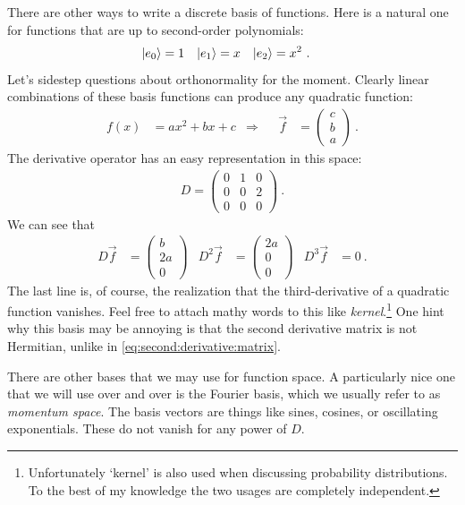 There are other ways to write a discrete basis of functions. Here is a natural one for functions that are up to second-order polynomials:
\begin{align}
  \left|e_0\right\rangle &= 1
  &
  \left|e_1\right\rangle &= x
  &
  \left|e_2\right\rangle &= x^2 \ .
\end{align}
Let’s sidestep questions about orthonormality for the moment. Clearly linear combinations of these basis functions can produce any quadratic function:
\begin{align}
  f(x) &= a x^2 + bx + c
  & \Rightarrow&&
  \vec{f} &=
  \begin{pmatrix}
     c \\ b \\ a
   \end{pmatrix} \ . 
\end{align}
The derivative operator has an easy representation in this space:
\begin{align}
  D = 
  \begin{pmatrix}
    0 & 1 & 0   \\
    0 & 0 & 2   \\
    0 & 0 & 0   
  \end{pmatrix} \ .
\end{align}
We can see that
\begin{align}
  D \vec{f}  &= 
  \begin{pmatrix}
     b \\
     2 a \\
     0
  \end{pmatrix} 
  &
  D^2 \vec{f}  &= 
  \begin{pmatrix}
     2a \\
     0 \\
     0
  \end{pmatrix} 
  &
  D^3 \vec{f}  &= 
  0 \ .
\end{align}
The last line is, of course, the realization that the third-derivative of a quadratic function vanishes. Feel free to attach mathy words to this like \emph{kernel}.\footnote{Unfortunately `kernel' is also used when discussing probability distributions. To the best of my knowledge the two usages are completely independent.} One hint why this basis may be annoying is that the second derivative matrix is not Hermitian, unlike in \eqref{eq:second:derivative:matrix}.

There are other bases that we may use for function space. A particularly nice one that we will use over and over is the Fourier basis, which we usually refer to as \emph{momentum space}. The basis vectors are things like sines, cosines, or oscillating exponentials. These do not vanish for any power of $D$.


